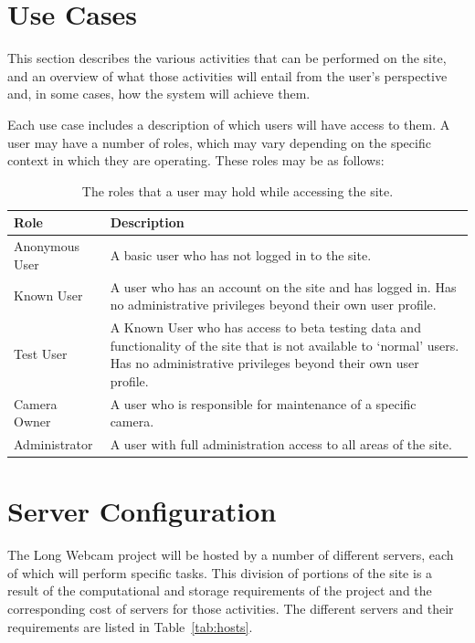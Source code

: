 \documentclass[11pt]{article}
\begin{document}
\clearpage
\section{Use Cases}
\label{sec:use_cases}
This section describes the various activities that can be performed on the site, and an overview of what those activities will entail from the user's perspective and, in some cases, how the system will achieve them.

Each use case includes a description of which users will have access to them. A user may have a number of roles, which may vary depending on the specific context in which they are operating. These roles may be as follows:

\begin{table}[h]
\begin{tabular}{ | p{1.45in} | p{4.45in} | }
\hline
\textbf{Role} & \textbf{Description} \\
\hline
Anonymous User & A basic user who has not logged in to the site. \\
\hline
Known User & A user who has an account on the site and has logged in. Has no administrative privileges beyond their own user profile. \\
\hline
Test User & A Known User who has access to beta testing data and functionality of the site that is not available to `normal' users. Has no administrative privileges beyond their own user profile. \\
\hline
Camera Owner & A user who is responsible for maintenance of a specific camera. \\
\hline
Administrator & A user with full administration access to all areas of the site. \\
\hline
\end{tabular}
\caption{The roles that a user may hold while accessing the site.}
\label{tab:roles}
\end{table}

\section{Server Configuration}
The Long Webcam project will be hosted by a number of different servers, each of which will perform specific tasks. This division of portions of the site is a result of the computational and storage requirements of the project and the corresponding cost of servers for those activities. The different servers and their requirements are listed in Table~\ref{tab:hosts}.
\end{document}
